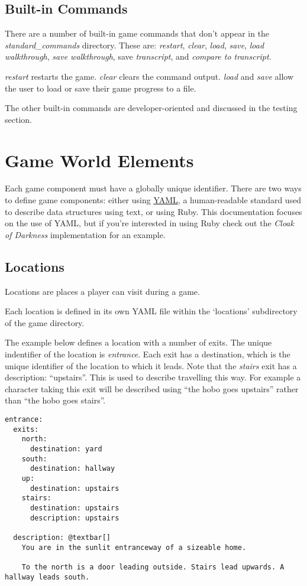 \documentclass[letterpaper,10pt,english]{sphinxmanual}
\begin{document}
\section{Built-in Commands}
\label{overview:built-in-commands}
There are a number of built-in game commands that don't appear in the \emph{standard\_commands} directory. These are: \emph{restart}, \emph{clear}, \emph{load}, \emph{save}, \emph{load walkthrough}, \emph{save walkthrough}, save \emph{transcript}, and \emph{compare to transcript}.

\emph{restart} restarts the game. \emph{clear} clears the command output. \emph{load} and \emph{save} allow the user to load or save their game progress to a file.

The other built-in commands are developer-oriented and discussed in the testing section.


\chapter{Game World Elements}
\label{elements:game-world-elements}\label{elements::doc}
Each game component must have a globally unique identifier. There are two ways to define game components: either using \href{http://www.yaml.org/}{YAML}, a human-readable standard used to describe data structures using text, or using Ruby. This documentation focuses on the use of YAML, but if you're interested in using Ruby check out the \emph{Cloak of Darkness} implementation for an example.


\section{Locations}
\label{elements:yaml}\label{elements:locations}
Locations are places a player can visit during a game.

Each location is defined in its own YAML file within the `locations' subdirectory of the game directory.

The example below defines a location with a number of exits. The unique indentifier of the location is \emph{entrance}. Each exit has a destination, which is the unique identifier of the location to which it leads. Note that the \emph{stairs} exit has a description: ``upstairs''. This is used to describe travelling this way. For example a character taking this exit will be described using  ``the hobo goes upstairs'' rather than ``the hobo goes stairs''.

\begin{Verbatim}[commandchars=@\[\]]
entrance:
  exits: 
    north:
      destination: yard
    south:
      destination: hallway
    up:
      destination: upstairs
    stairs:
      destination: upstairs
      description: upstairs

  description: @textbar[]
    You are in the sunlit entranceway of a sizeable home.

    To the north is a door leading outside. Stairs lead upwards. A hallway leads south.
\end{Verbatim}
\end{document}

